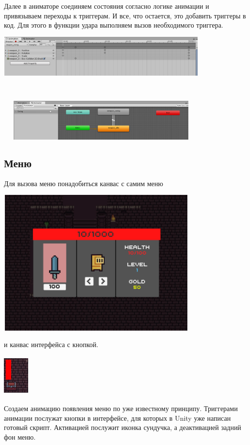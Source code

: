 \documentclass[a4paper,12pt]{article}
\begin{document}
Далее в аниматоре соединяем состояния согласно логике анимации и привязываем переходы к триггерам. И все, что остается, это добавить триггеры в код. Для этого в функции удара выполняем вызов необходимого триггера. \\
\centerline{\includegraphics[width = 400px, height=80px]{pictures/anim1.png}} \\
\centerline{\includegraphics[width = 400px, height=80px]{pictures/anim2.png}}

\newpage
\subsection{Меню}
Для вызова меню понадобиться канвас с самим меню \\
\centerline{\includegraphics[width = 380px, height=280px]{pictures/menu.png}}

и канвас интерфейса с кнопкой. \\
\centerline{\includegraphics[width =50px, height=80px]{pictures/hud.png}}

Создаем анимацию появления меню по уже известному принципу. Триггерами анимации послужат кнопки в интерфейсе, для которых в Unity уже написан готовый скрипт. Активацией послужит иконка сундучка, а деактивацией задний фон меню. \\
\end{document}
